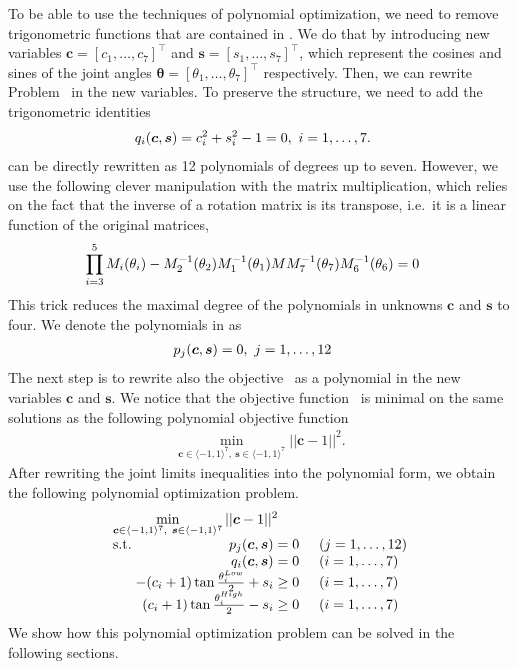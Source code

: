 To be able to use the techniques of polynomial optimization, we need to remove trigonometric functions that are contained in . We do that by introducing new variables $\bm{c} = [c_1, \ldots, c_7]^\top$ and $\bm{s} = [s_1, \ldots, s_7]^\top$, which represent the cosines and sines of the joint angles $\bm{\theta} = [\theta_1, \ldots, \theta_7]^\top$ respectively. Then, we can rewrite Problem~ in the new variables. To preserve the structure, we need to add the trigonometric identities
\begin{align}
  q_i(\bm{c}, \bm{s}) &= c_i^2 + s_i^2 -1 = 0,\ i=1,\ldots,7. \labeleq{IKT:q}
\end{align}
 can be directly rewritten as 12 polynomials of degrees up to seven. However, we use the following clever manipulation with the matrix multiplication, which relies on the fact that the inverse of a rotation matrix is its transpose, i.e.\ it is a linear function of the original matrices,
\begin{align}
  \prod_{i=3}^5M_i(\theta_i) - M_2^{-1}(\theta_2)M_1^{-1}(\theta_1)MM_7^{-1}(\theta_7)M_6^{-1}(\theta_6) &= 0 \labeleq{IKT:DH4}
\end{align}
This trick reduces the maximal degree of the polynomials in unknowns $\bm{c}$ and $\bm{s}$ to four.
We denote the polynomials in  as
\begin{align}
  p_j(\bm{c}, \bm{s}) &= 0,\ j = 1,\ldots, 12 \labeleq{IKT:p}
\end{align}
The next step is to rewrite also the objective~ as a polynomial in the new variables $\bm{c}$ and $\bm{s}$. We notice that the objective function~ is minimal on the same solutions as the following polynomial objective function
\begin{align}
  \min_{\bm{c}\in\langle-1,1\rangle^{7},\ \bm{s}\in\langle-1,1\rangle^7} ||\bm{c}-1||^2.
\end{align}
After rewriting the joint limits inequalities  into the polynomial form, we obtain the following polynomial optimization problem.
\begin{align}
  \arraycolsep=1.4pt
  \begin{array}{lrcl@{\hskip0.5cm}l}
    \multicolumn{5}{l}{\displaystyle \min_{\bm{c}\in\langle-1,1\rangle^{7},\ \bm{s}\in\langle-1,1\rangle^7} ||\bm{c}-1||^2} \\
    \text{s.t.} & p_j(\bm{c}, \bm{s}) &=& 0 & (j = 1,\ldots, 12) \\
    & q_i(\bm{c}, \bm{s}) &=& 0 & (i = 1,\ldots,7) \\
    & -(c_i+1)\tan\frac{\theta_i^{Low}}{2}+s_i &\geq&0 & (i = 1,\ldots,7) \\
    & (c_i+1)\tan\frac{\theta_i^{High}}{2}-s_i &\geq&0 & (i = 1,\ldots,7)
  \end{array}\labeleq{IKT:deg4}
\end{align}
We show how this polynomial optimization problem can be solved in the following sections.

